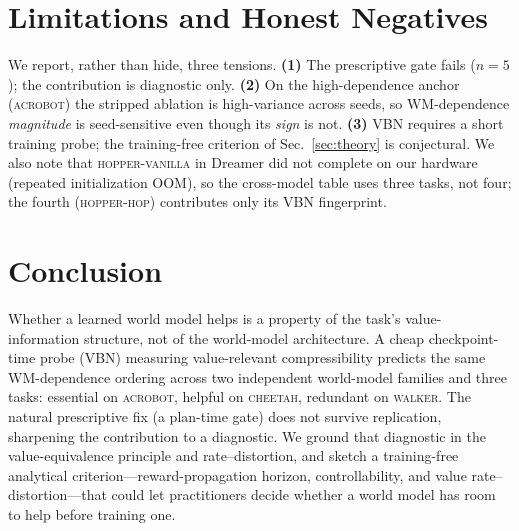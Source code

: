 \documentclass[letterpaper]{article}
\begin{document}
\section{Limitations and Honest Negatives}
We report, rather than hide, three tensions. \textbf{(1)} The prescriptive
gate fails ($n{=}5$); the contribution is diagnostic only. \textbf{(2)} On the
high-dependence anchor (\textsc{acrobot}) the stripped ablation is
high-variance across seeds, so WM-dependence \emph{magnitude} is seed-sensitive
even though its \emph{sign} is not. \textbf{(3)} VBN requires a short training
probe; the training-free criterion of Sec.~\ref{sec:theory} is conjectural. We
also note that \textsc{hopper-vanilla} in Dreamer did not complete on our
hardware (repeated initialization OOM), so the cross-model table uses three
tasks, not four; the fourth (\textsc{hopper-hop}) contributes only its VBN
fingerprint.

\section{Conclusion}
Whether a learned world model helps is a property of the task's
value-information structure, not of the world-model architecture. A cheap
checkpoint-time probe (VBN) measuring value-relevant compressibility predicts
the same WM-dependence ordering across two independent world-model families
and three tasks: essential on \textsc{acrobot}, helpful on \textsc{cheetah},
redundant on \textsc{walker}. The natural prescriptive fix (a plan-time gate)
does not survive replication, sharpening the contribution to a diagnostic. We
ground that diagnostic in the value-equivalence principle and rate--distortion,
and sketch a training-free analytical criterion---reward-propagation horizon,
controllability, and value rate--distortion---that could let practitioners
decide whether a world model has room to help before training one.
\end{document}

